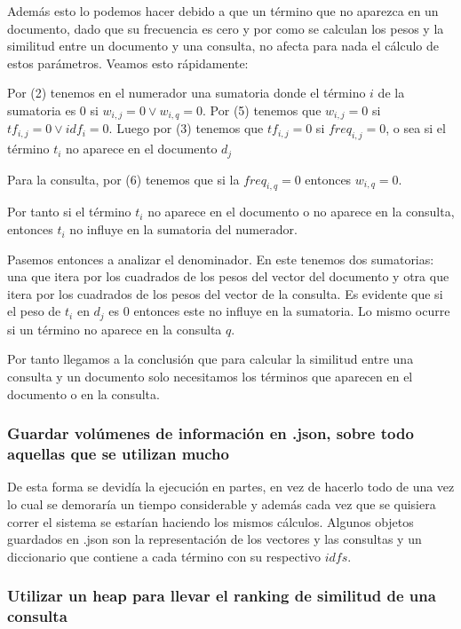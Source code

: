 \documentclass[runningheads]{llncs}
\begin{document}
	Adem\'as esto lo podemos hacer debido a que un t\'ermino que no aparezca en un documento, dado que su frecuencia es cero y por como se calculan los pesos y la similitud entre un documento y una consulta, no afecta para nada el c\'alculo de estos par\'ametros. Veamos esto r\'apidamente:
	
	Por (2) tenemos en el numerador una sumatoria donde el t\'ermino $i$ de la sumatoria es 0 si $w_{i,j}=0 \lor w_{i,q}=0$. Por (5) tenemos que $w_{i,j}=0$ si $tf_{i,j}=0 \lor idf_i=0$. Luego por (3) tenemos que $tf_{i,j}=0$ si $freq_{i,j}=0$, o sea si el t\'ermino $t_i$ no aparece en el documento $d_j$
	
	Para la consulta, por (6) tenemos que si la $freq_{i,q}=0$ entonces $w_{i,q}=0$.
	
	Por tanto si el t\'ermino $t_i$ no aparece en el documento o no aparece en la consulta, entonces $t_i$ no influye en la sumatoria del numerador.
	
	Pasemos entonces a analizar el denominador. En este tenemos dos sumatorias: una que itera por los cuadrados de los pesos del vector del documento y otra que itera por los cuadrados de los pesos del vector de la consulta. Es evidente que si el peso de $t_i$ en $d_j$ es 0 entonces este no influye en la sumatoria. Lo mismo ocurre si un t\'ermino no aparece en la consulta $q$.
	
	Por tanto llegamos a la conclusi\'on que para calcular la similitud entre una consulta y un documento solo necesitamos los t\'erminos que aparecen en el documento o en la consulta.
	
	 \subsubsection{Guardar volúmenes de informaci\'on en .json, sobre todo aquellas que se utilizan mucho} De esta forma se devid\'ia la ejecuci\'on en partes, en vez de hacerlo todo de una vez lo cual se demorar\'ia un tiempo considerable y adem\'as cada vez que se quisiera correr el sistema se estar\'ian haciendo los mismos c\'alculos. Algunos objetos guardados en .json son la representaci\'on de los vectores y las consultas y un diccionario que contiene a cada t\'ermino con su respectivo $idfs$.
	
	\subsubsection{Utilizar un heap para llevar el ranking de similitud de una consulta}
		
\end{document}
